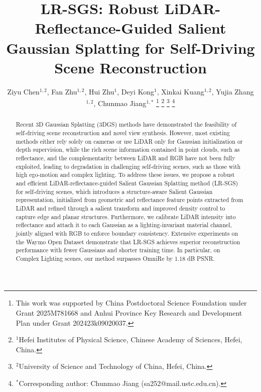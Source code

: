 \documentclass[letterpaper, 10 pt, conference]{ieeeconf}  %
\title{\LARGE \bf
LR-SGS: Robust LiDAR-Reflectance-Guided Salient Gaussian Splatting for Self-Driving Scene Reconstruction
}
\author{Ziyu Chen$^{1,2}$, Fan Zhu$^{1,2}$, Hui Zhu$^{1}$, Deyi Kong$^{1}$, Xinkai Kuang$^{1,2}$, Yujia Zhang$^{1,2}$, Chunmao Jiang$^{1,*}$%
\thanks{This work was supported by China Postdoctoral Science Foundation under Grant 2025M781668 and Anhui Province Key Research and Development Plan under Grant 202423k09020037.}
\thanks{$^{1}$Hefei Institutes of Physical Science, Chinese Academy of Sciences, Hefei, China.}%
\thanks{$^{2}$University of Science and Technology of China, Hefei, China.}%
\thanks{$^{*}$Corresponding author: Chunmao Jiang (sa252@mail.ustc.edu.cn).}%
}
\begin{document}
\maketitle
\thispagestyle{empty}
\pagestyle{empty}


\begin{abstract}

Recent 3D Gaussian Splatting (3DGS) methods have demonstrated the feasibility of self-driving scene reconstruction and novel view synthesis. However, most existing methods either rely solely on cameras or use LiDAR only for Gaussian initialization or depth supervision, while the rich scene information contained in point clouds, such as reflectance, and the complementarity between LiDAR and RGB have not been fully exploited, leading to degradation in challenging self-driving scenes, such as those with high ego-motion and complex lighting. To address these issues, we propose a robust and efficient LiDAR-reflectance-guided Salient Gaussian Splatting method (LR-SGS) for self-driving scenes, which introduces a structure-aware Salient Gaussian representation, initialized from geometric and reflectance feature points extracted from LiDAR and refined through a salient transform and improved density control to capture edge and planar structures. Furthermore, we calibrate LiDAR intensity into reflectance and attach it to each Gaussian as a lighting-invariant material channel, jointly aligned with RGB to enforce boundary consistency. Extensive experiments on the Waymo Open Dataset demonstrate that LR-SGS achieves superior reconstruction performance with fewer Gaussians and shorter training time. In particular, on Complex Lighting scenes, our method surpasses OmniRe by 1.18 dB PSNR.

\end{abstract}
\end{document}
